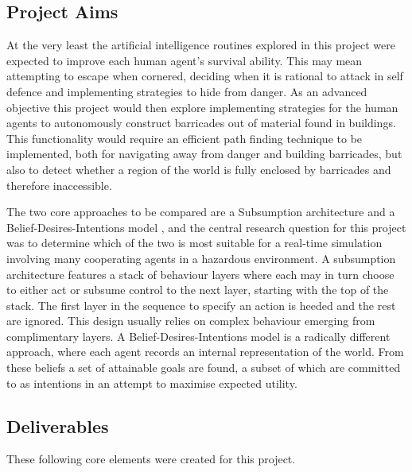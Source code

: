 \documentclass[a4paper,12pt]{article}
\begin{document}
\subsection{Project Aims}\noindent
At the very least the artificial intelligence routines explored in this project were expected to improve each human agent's survival ability. This may mean attempting to escape when cornered, deciding when it is rational to attack in self defence and implementing strategies to hide from danger. As an advanced objective this project would then explore implementing strategies for the human agents to autonomously construct barricades out of material found in buildings. This functionality would require an efficient path finding technique to be implemented, both for navigating away from danger and building barricades, but also to detect whether a region of the world is fully enclosed by barricades and therefore inaccessible.

The two core approaches to be compared are a Subsumption architecture \cite{brooks90} and a Belief-Desires-Intentions model \cite{rao95}, and the central research question for this project was to determine which of the two is most suitable for a real-time simulation involving many cooperating agents in a hazardous environment. A subsumption architecture features a stack of behaviour layers where each may in turn choose to either act or subsume control to the next layer, starting with the top of the stack. The first layer in the sequence to specify an action is heeded and the rest are ignored. This design usually relies on complex behaviour emerging from complimentary layers. A Belief-Desires-Intentions model is a radically different approach, where each agent records an internal representation of the world. From these beliefs a set of attainable goals are found, a subset of which are committed to as intentions in an attempt to maximise expected utility.

\subsection{Deliverables}\noindent
These following core elements were created for this project.
\end{document}
